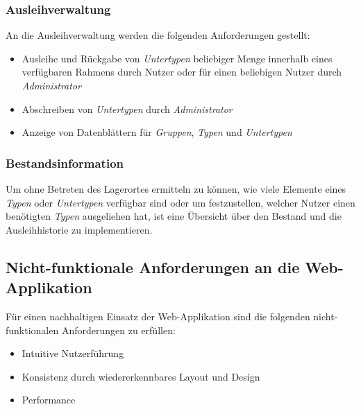 \documentclass[
]{article}
\providecommand{\tightlist}{%
  \setlength{\itemsep}{0pt}\setlength{\parskip}{0pt}}
\begin{document}
\hypertarget{ausleihverwaltung}{%
\subsubsection{Ausleihverwaltung}\label{ausleihverwaltung}}

An die Ausleihverwaltung werden die folgenden Anforderungen gestellt:

\begin{itemize}
\tightlist
\item
  Ausleihe und Rückgabe von \emph{Untertypen} beliebiger Menge innerhalb eines verfügbaren Rahmens durch Nutzer oder für einen beliebigen Nutzer durch \emph{Administrator}
\item
  Abschreiben von \emph{Untertypen} durch \emph{Administrator}
\item
  Anzeige von Datenblättern für \emph{Gruppen}, \emph{Typen} und \emph{Untertypen}
\end{itemize}

\hypertarget{bestandsinformation}{%
\subsubsection{Bestandsinformation}\label{bestandsinformation}}

Um ohne Betreten des Lagerortes ermitteln zu können, wie viele Elemente eines \emph{Typen} oder \emph{Untertypen} verfügbar sind oder um festzustellen, welcher Nutzer einen benötigten \emph{Typen} ausgeliehen hat, ist eine Übersicht über den Bestand und die Ausleihhistorie zu implementieren.

\hypertarget{nicht-funktionale-anforderungen-an-die-web-applikation}{%
\subsection{Nicht-funktionale Anforderungen an die Web-Applikation}\label{nicht-funktionale-anforderungen-an-die-web-applikation}}

Für einen nachhaltigen Einsatz der Web-Applikation sind die folgenden nicht-funktionalen Anforderungen zu erfüllen:

\begin{itemize}
\tightlist
\item
  Intuitive Nutzerführung
\item
  Konsistenz durch wiedererkennbares Layout und Design
\item
  Performance
\end{itemize}
\end{document}
